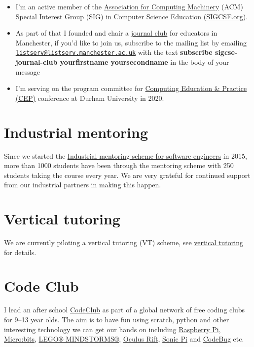 \documentclass[12pt,]{book}
\providecommand{\tightlist}{%
  \setlength{\itemsep}{0pt}\setlength{\parskip}{0pt}}
\begin{document}
\begin{itemize}
\tightlist
\item
  I'm an active member of the \href{https://en.wikipedia.org/wiki/Association_for_Computing_Machinery}{Association for Computing Machinery} (ACM) Special Interest Group (SIG) in Computer Science Education (\href{https://sigcse.org}{SIGCSE.org}).
\item
  As part of that I founded and chair a \href{https://duncan.hull.name/2019/07/17/sigcse-journal-club/}{journal club} for educators in Manchester, if you'd like to join us, subscribe to the mailing list by emailing \href{mailto:listserv@listserv.manchester.ac.uk}{\nolinkurl{listserv@listserv.manchester.ac.uk}} with the text \textbf{subscribe sigcse-journal-club yourfirstname yoursecondname} in the body of your message
\item
  I'm serving on the program committee for \href{http://community.dur.ac.uk/cep.conference}{Computing Education \& Practice (CEP)} conference at Durham University in 2020.
\end{itemize}

\hypertarget{industrial-mentoring-1}{%
\section{Industrial mentoring}\label{industrial-mentoring-1}}

Since we started the \href{https://www.cs.manchester.ac.uk/connect/business-engagement/industrial-mentoring/}{Industrial mentoring scheme for software engineers} in 2015, more than 1000 students have been through the mentoring scheme with 250 students taking the course every year. We are very grateful for continued support from our industrial partners in making this happen.

\hypertarget{vertical-tutoring}{%
\section{Vertical tutoring}\label{vertical-tutoring}}

We are currently piloting a vertical tutoring (VT) scheme, see \protect\hyperlink{vertical-tutoring-1}{vertical tutoring} for details.

\hypertarget{codeclub}{%
\section{Code Club}\label{codeclub}}

I lead an after school \href{https://codeclub.org}{CodeClub} as part of a global network of free coding clubs for 9--13 year olds. The aim is to have fun using scratch, python and other interesting technology we can get our hands on including \href{https://www.raspberrypi.org/}{Raspberry Pi}, \href{https://microbit.org/}{Micro:bits}, \href{https://www.lego.com/en-gb/themes/mindstorms}{LEGO® MINDSTORMS®}, \href{https://www.oculus.com}{Oculus Rift}, \href{https://sonic-pi.net/}{Sonic Pi} and \href{http://www.codebug.org.uk/}{CodeBug} etc.
\end{document}
